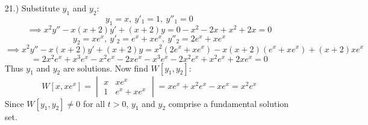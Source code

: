 \documentclass[12pt]{article}
\newcommand{\bracks}[1]{\left[#1\right]}
\begin{document}
\begin{itemize}
    \item[21.)] Substitute $y_1$ and $y_2$:
    \[y_1=x,\ y'_1=1,\ y''_1=0\]
    \[\implies x^2y''-x(x+2)y'+(x+2)y=0-x^2-2x+x^2+2x=0\]
    \[y_2=xe^x,\ y'_2=e^x+xe^x,\ y''_2=2e^x+xe^x\]
    \[\implies x^2y''-x(x+2)y'+(x+2)y=x^2(2e^x+xe^x)-x(x+2)(e^x+xe^x)+(x+2)xe^x\]
    \[=2x^2e^x+x^3e^x-x^2e^x-2xe^x-x^3e^x-2x^2e^x+x^2e^x+2xe^x=0\]
    Thus $y_1$ and $y_2$ are solutions. Now find $W\bracks{y_1,y_2}$:
    \[W\bracks{x,xe^x}=\begin{vmatrix}
        x & xe^x \\
        1 & e^x+xe^x
    \end{vmatrix}=xe^x+x^2e^x-xe^x=x^2e^x\]
    Since $W\bracks{y_1,y_2}\neq0$ for all $t>0$, $y_1$ and $y_2$ comprise a fundamental solution set.
\end{itemize}
\end{document}

